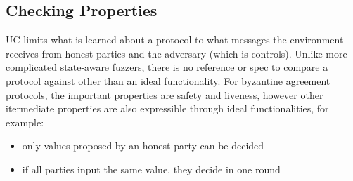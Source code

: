%
%

\subsection{Checking Properties}
UC limits what is learned about a protocol to what messages the environment receives from honest parties and the adversary (which is controls).
Unlike more complicated state-aware fuzzers, there is no reference or spec to compare a protocol against other than an ideal functionality.
For byzantine agreement protocols, the important properties are safety and liveness, however other itermediate properties are also expressible through ideal functionalities, for example:
\begin{itemize}
\item only values proposed by an honest party can be decided
\item if all parties input the same value, they decide in one round 
\end{itemize}


